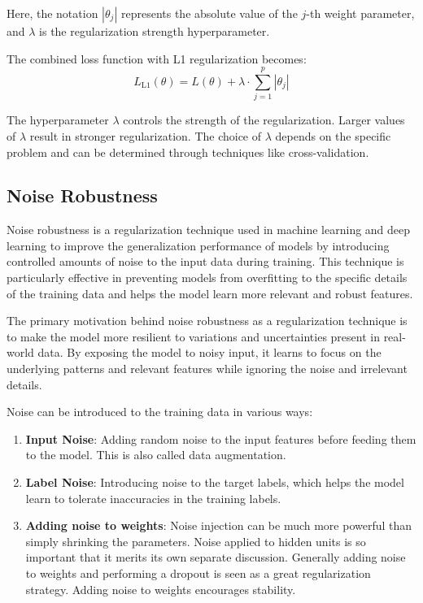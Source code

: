 \documentclass{report}
\begin{document}
Here, the notation \( |\theta_j| \) represents the absolute value of the \( j \)-th weight parameter, and \( \lambda \) is the regularization strength hyperparameter.

The combined loss function with L1 regularization becomes:
\[ L_\text{L1}(\theta) = L(\theta) + \lambda \cdot \sum_{j=1}^{p} |\theta_j| \]


The hyperparameter \( \lambda \) controls the strength of the regularization. Larger values of \( \lambda \) result in stronger regularization. The choice of \( \lambda \) depends on the specific problem and can be determined through techniques like cross-validation.

\subsection{Noise Robustness}

Noise robustness is a regularization technique used in machine learning and deep learning to improve the generalization performance of models by introducing controlled amounts of noise to the input data during training. This technique is particularly effective in preventing models from overfitting to the specific details of the training data and helps the model learn more relevant and robust features.

The primary motivation behind noise robustness as a regularization technique is to make the model more resilient to variations and uncertainties present in real-world data. By exposing the model to noisy input, it learns to focus on the underlying patterns and relevant features while ignoring the noise and irrelevant details.

Noise can be introduced to the training data in various ways:
\begin{enumerate}
	\item \textbf{Input Noise}: Adding random noise to the input features before feeding them to the model. This is also called data augmentation.

	\item \textbf{Label Noise}: Introducing noise to the target labels, which helps the model learn to tolerate inaccuracies in the training labels.

	\item \textbf{Adding noise to weights}: Noise injection can be much more powerful than simply shrinking the parameters. Noise applied to hidden units is so important that it merits its own separate discussion. Generally adding noise to weights and performing a dropout is seen as a great regularization strategy. Adding noise to weights encourages stability.
\end{enumerate}
\end{document}
